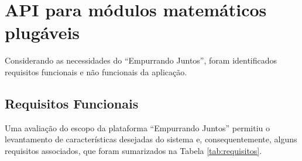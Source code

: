 \chapter{API para módulos matemáticos plugáveis} \label{cap:proposta}

Considerando as necessidades do ``Empurrando Juntos'', foram identificados requisitos funcionais e não funcionais 
da aplicação.

\section*{Requisitos Funcionais}

Uma avaliação do escopo da plataforma ``Empurrando Juntos'' permitiu o levantamento de características desejadas do sistema e,
consequentemente, alguns requisitos associados, que foram sumarizados na Tabela \ref{tab:requisitos}.

